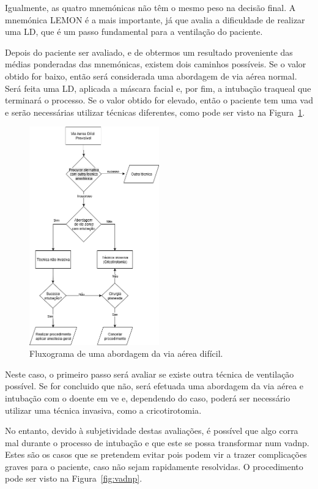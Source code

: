 \documentclass[a4paper,12pt,twoside]{article}
\begin{document}
    Igualmente, as quatro mnemónicas não têm o mesmo peso na decisão final. A mnemónica \gls{LEMON} é a mais importante, já que avalia a dificuldade de realizar uma \gls{LD}, que é um passo fundamental para a ventilação do paciente.

    Depois do paciente ser avaliado, e de obtermos um resultado proveniente das médias ponderadas das mnemónicas, existem dois caminhos possíveis. Se o valor obtido for baixo, então será considerada uma abordagem de via aérea normal. Será feita uma \gls{LD}, aplicada a máscara facial e, por fim, a intubação traqueal que terminará o processo. Se o valor obtido for elevado, então o paciente tem uma \gls{vad} e serão necessárias utilizar técnicas diferentes, como pode ser visto na Figura~\ref{fig:vad}.

    \begin{figure}[H]
        \centering
        \includegraphics[width=0.5\textwidth]{./resources/pdf/vad.drawio.png}
        \caption{Fluxograma de uma abordagem da via aérea difícil.}
        \label{fig:vad}
    \end{figure}

    Neste caso, o primeiro passo será avaliar se existe outra técnica de ventilação possível. Se for concluido que não, será efetuada uma abordagem da via aérea e intubação com o doente em \gls{ve} e, dependendo do caso, poderá ser necessário utilizar uma técnica invasiva, como a \gls{cricotirotomia}.

    No entanto, devido à subjetividade destas avaliações, é possível que algo corra mal durante o processo de intubação e que este se possa transformar num \gls{vadnp}. Estes são os casos que se pretendem evitar pois podem vir a trazer complicações graves para o paciente, caso não sejam rapidamente resolvidas. O procedimento pode ser visto na Figura~\ref{fig:vadnp}.
\end{document}
